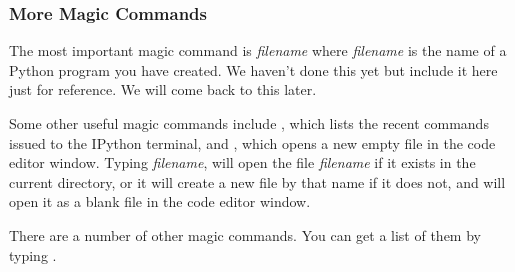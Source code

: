 \documentclass[letterpaper,10pt,english]{sphinxmanual}
\begin{document}
\subsubsection{More Magic Commands}
\label{chap2/chap2_basics:more-magic-commands}
The most important magic command is  \emph{filename} where \emph{filename} is the name of a Python program you have created.  We haven't done this yet but include it here just for reference.  We will come back to this later.

Some other useful magic commands include , which lists the recent commands issued to the IPython terminal, and , which opens a new empty file in the code editor window.  Typing  \emph{filename}, will open the file \emph{filename} if it exists in the current directory, or it will create a new file by that name if it does not, and will open it as a blank file in the code editor window.

There are a number of other magic commands.  You can get a list of them by typing .
\end{document}
